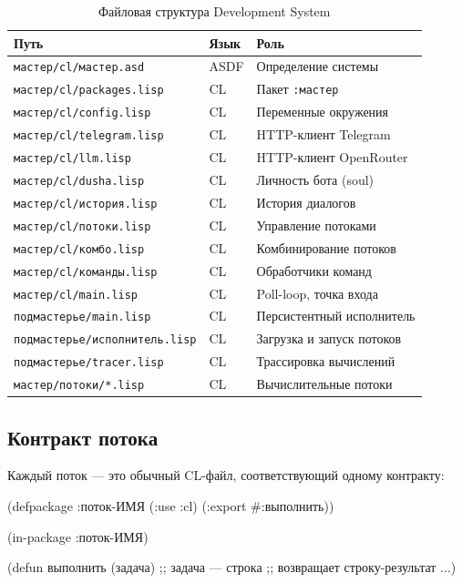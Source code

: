 \documentclass[11pt,a4paper]{article}
\begin{document}
\begin{table}[H]
\centering\small
\begin{tabular}{lll}
\toprule
\textbf{Путь} & \textbf{Язык} & \textbf{Роль} \\
\midrule
\texttt{мастер/cl/мастер.asd}     & ASDF  & Определение системы \\
\texttt{мастер/cl/packages.lisp}  & CL    & Пакет \texttt{:мастер} \\
\texttt{мастер/cl/config.lisp}    & CL    & Переменные окружения \\
\texttt{мастер/cl/telegram.lisp}  & CL    & HTTP-клиент Telegram \\
\texttt{мастер/cl/llm.lisp}       & CL    & HTTP-клиент OpenRouter \\
\texttt{мастер/cl/dusha.lisp}     & CL    & Личность бота (soul) \\
\texttt{мастер/cl/история.lisp}   & CL    & История диалогов \\
\texttt{мастер/cl/потоки.lisp}    & CL    & Управление потоками \\
\texttt{мастер/cl/комбо.lisp}     & CL    & Комбинирование потоков \\
\texttt{мастер/cl/команды.lisp}   & CL    & Обработчики команд \\
\texttt{мастер/cl/main.lisp}      & CL    & Poll-loop, точка входа \\
\texttt{подмастерье/main.lisp}    & CL    & Персистентный исполнитель \\
\texttt{подмастерье/исполнитель.lisp} & CL & Загрузка и запуск потоков \\
\texttt{подмастерье/tracer.lisp}  & CL    & Трассировка вычислений \\
\texttt{мастер/потоки/*.lisp}     & CL    & Вычислительные потоки \\
\bottomrule
\end{tabular}
\caption{Файловая структура Development System}
\end{table}

\subsection{Контракт потока}

Каждый поток — это обычный CL-файл, соответствующий одному контракту:

\begin{lispcode}[caption={Контракт вычислительного потока}]
(defpackage :поток-ИМЯ
  (:use :cl)
  (:export #:выполнить))

(in-package :поток-ИМЯ)

(defun выполнить (задача)
  ;; задача — строка
  ;; возвращает строку-результат
  ...)
\end{lispcode}
\end{document}
